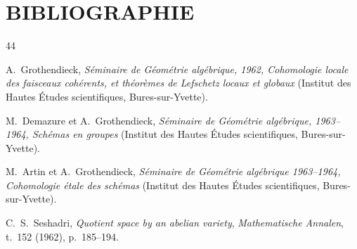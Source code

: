 {}
\section*{BIBLIOGRAPHIE}

\begin{thebibliography}{44}

A.~Grothendieck, \emph{Séminaire de Géométrie algébrique, 1962,
Cohomologie locale des faisceaux cohérents, et théorèmes de Lefschetz locaux
et globaux} (Institut des Hautes Études scientifiques, Bures-sur-Yvette).

M.~Demazure et A.~Grothendieck, \emph{Séminaire de Géométrie algébrique,
1963--1964, Schémas en groupes} (Institut des Hautes Études scientifiques,
Bures-sur-Yvette).

M.~Artin et A.~Grothendieck, \emph{Séminaire de Géométrie algébrique
1963--1964, Cohomologie étale des schémas} (Institut des Hautes Études
scientifiques, Bures-sur-Yvette).

C.~S.~Seshadri, \emph{Quotient space by an abelian variety},
\emph{Mathematische Annalen}, t.~152 (1962), p.~185--194.

\end{thebibliography}

\clearpage
